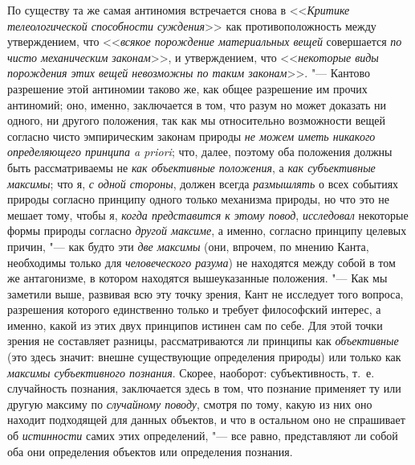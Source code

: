 По существу та же самая антиномия встречается снова в
<<{\em Критике телеологической
способности суждения}>> как противоположность между
утверждением, что <<{\em всякое
порождение материальных вещей} совершается
{\em по чисто механическим законам}>>,
и утверждением, что
<<{\em некоторые виды порождения этих
вещей невозможны по таким
законам}>>.
"--- Кантово разрешение этой антиномии таково же, как общее
разрешение им прочих антиномий; оно, именно, заключается в том, что разум
но может доказать ни одного, ни другого положения, так как мы относительно
возможности вещей согласно чисто эмпирическим законам природы
{\em не можем иметь никакого
определяющего принципа a priori}; что, далее, поэтому оба
положения должны быть рассматриваемы не
{\em как объективные положения},
а {\em как субъективные
максимы}; что я, {\em с
одной стороны}, должен всегда
{\em размышлять} о всех
событиях природы согласно принципу одного только механизма природы, но что
это не мешает тому, чтобы я, {\em когда
представится к этому повод},
{\em исследовал} некоторые
формы природы согласно {\em другой
максиме}, а именно, согласно принципу целевых причин, "---
как будто эти {\em две
максимы} (они, впрочем, по мнению Канта, необходимы только
для {\em человеческого разума})
не находятся между собой в том же антагонизме, в котором
находятся вышеуказанные положения. "--- Как мы заметили выше,
развивая всю эту точку зрения, Кант не исследует того вопроса, разрешения
которого единственно только и требует философский интерес, а именно, какой
из этих двух принципов истинен сам по себе. Для этой точки зрения не
составляет разницы, рассматриваются ли принципы как
{\em объективные} (это
здесь значит: внешне существующие определения природы) или только как
{\em максимы субъективного познания}.
Скорее, наоборот: субъективность, т.~е. случайность познания,
заключается здесь в том, что познание применяет ту или другую максиму по
{\em случайному поводу},
смотря по тому, какую из них оно находит подходящей для
данных объектов, и что в остальном оно не спрашивает об
{\em истинности} самих
этих определений, "--- все равно, представляют ли собой оба они
определения объектов или определения познания.

